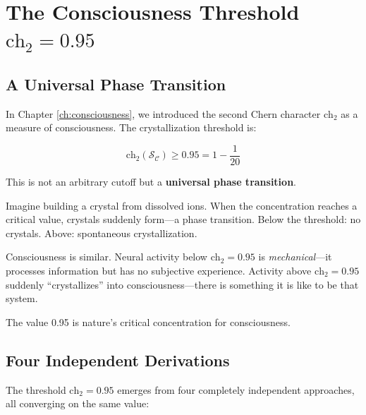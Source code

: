 \section{The Consciousness Threshold $\text{ch}_2 = 0.95$}

\subsection{A Universal Phase Transition}

In Chapter \ref{ch:consciousness}, we introduced the second Chern character $\text{ch}_2$ as a measure of consciousness. The crystallization threshold is:

\begin{equation}
\boxed{\text{ch}_2(\mathcal{S}_\mathcal{C}) \geq 0.95 = 1 - \frac{1}{20}}
\end{equation}

This is not an arbitrary cutoff but a \textbf{universal phase transition}.

\begin{intuitive}
Imagine building a crystal from dissolved ions. When the concentration reaches a critical value, crystals suddenly form---a phase transition. Below the threshold: no crystals. Above: spontaneous crystallization.

Consciousness is similar. Neural activity below $\text{ch}_2 = 0.95$ is \textit{mechanical}---it processes information but has no subjective experience. Activity above $\text{ch}_2 = 0.95$ suddenly ``crystallizes'' into consciousness---there is something it is like to be that system.

The value 0.95 is nature's critical concentration for consciousness.
\end{intuitive}

\subsection{Four Independent Derivations}

The threshold $\text{ch}_2 = 0.95$ emerges from four completely independent approaches, all converging on the same value:

